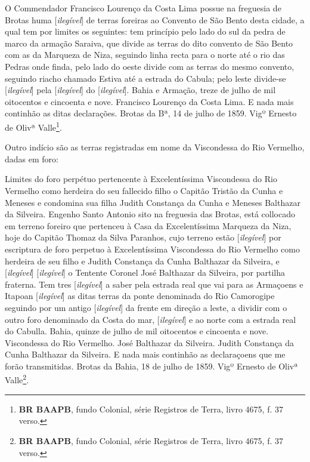 \begin{citacao}
O Commendador Francisco Lourenço da Costa Lima possue na freguesia de Brotas huma [\textit{ilegível}] de terras foreiras ao Convento de São Bento desta cidade, a qual tem por limites os seguintes: tem princípio pelo lado do sul da pedra de marco da armação Saraiva, que divide as terras do dito convento de São Bento com as da Marqueza de Niza, seguindo linha recta para o norte até o rio das Pedras onde finda, pelo lado do oeste divide com as terras do mesmo convento, seguindo riacho chamado Estiva até a estrada do Cabula; pelo leste divide-se [\textit{ilegível}] pela [\textit{ilegível}] do [\textit{ilegível}]. Bahia e Armação, treze de julho de mil oitocentos e cincoenta e nove. Francisco Lourenço da Costa Lima. E nada mais continhão as ditas declarações. Brotas da Bª, 14 de julho de 1859. Vigº Ernesto de Olivª Valle\footnote{\textbf{BR BAAPB}, fundo Colonial, série Registros de Terra, livro 4675, f. 37 verso.}.
\end{citacao}

Outro indício são as terras registradas em nome da Viscondessa do Rio Vermelho, dadas em foro:

\begin{citacao}
Limites do foro perpétuo pertencente à Excelentíssima Viscondessa do Rio Vermelho como herdeira do seu fallecido filho o Capitão Tristão da Cunha e Meneses e condomina sua filha Judith Constança da Cunha e Meneses Balthazar da Silveira. Engenho Santo Antonio sito na freguesia das Brotas, está collocado em terreno foreiro que pertenceu à Casa da Excelentíssima Marqueza da Niza, hoje do Capitão Thomaz da Silva Paranhos, cujo terreno estão [\textit{ilegível}] por escriptura de foro perpetuo à Excelentíssima Viscondessa do Rio Vermelho como herdeira de seu filho e Judith Constança da Cunha Balthazar da Silveira, e [\textit{ilegível}] [\textit{ilegível}] o Tentente Coronel José Balthazar da Silveira, por partilha fraterna. Tem tres [\textit{ilegível}] a saber pela estrada real que vai para as Armaçoens e Itapoan [\textit{ilegível}] as ditas terras da ponte denominada do Rio Camorogipe seguindo por um antigo [\textit{ilegível}] da frente em direção a leste, a dividir com o outro foro denominado da Costa do mar, [\textit{ilegível}] e ao norte com a estrada real do Cabulla. Bahia, quinze de julho de mil oitocentos e cincoenta e nove. Viscondessa do Rio Vermelho. José Balthazar da Silveira. Judith Constança da Cunha Balthazar da Silveira. E nada mais continhão as declaraçoens que me forão transmitidas. Brotas da Bahia, 18 de julho de 1859. Vigº Ernesto de Olivª Valle\footnote{\textbf{BR BAAPB}, fundo Colonial, série Registros de Terra, livro 4675, f. 37 verso.}.
\end{citacao}

